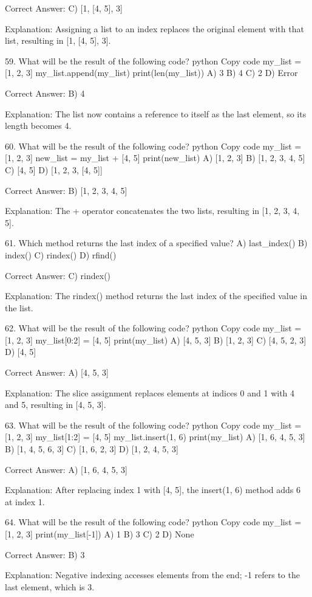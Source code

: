 Correct Answer: C) [1, [4, 5], 3]

Explanation:
Assigning a list to an index replaces the original element with that list, resulting in [1, [4, 5], 3].

59. What will be the result of the following code?
python
Copy code
my_list = [1, 2, 3]
my_list.append(my_list)
print(len(my_list))
A) 3
B) 4
C) 2
D) Error

Correct Answer: B) 4

Explanation:
The list now contains a reference to itself as the last element, so its length becomes 4.

60. What will be the result of the following code?
python
Copy code
my_list = [1, 2, 3]
new_list = my_list + [4, 5]
print(new_list)
A) [1, 2, 3]
B) [1, 2, 3, 4, 5]
C) [4, 5]
D) [1, 2, 3, [4, 5]]

Correct Answer: B) [1, 2, 3, 4, 5]

Explanation:
The + operator concatenates the two lists, resulting in [1, 2, 3, 4, 5].

61. Which method returns the last index of a specified value?
A) last_index()
B) index()
C) rindex()
D) rfind()

Correct Answer: C) rindex()

Explanation:
The rindex() method returns the last index of the specified value in the list.

62. What will be the result of the following code?
python
Copy code
my_list = [1, 2, 3]
my_list[0:2] = [4, 5]
print(my_list)
A) [4, 5, 3]
B) [1, 2, 3]
C) [4, 5, 2, 3]
D) [4, 5]

Correct Answer: A) [4, 5, 3]

Explanation:
The slice assignment replaces elements at indices 0 and 1 with 4 and 5, resulting in [4, 5, 3].

63. What will be the result of the following code?
python
Copy code
my_list = [1, 2, 3]
my_list[1:2] = [4, 5]
my_list.insert(1, 6)
print(my_list)
A) [1, 6, 4, 5, 3]
B) [1, 4, 5, 6, 3]
C) [1, 6, 2, 3]
D) [1, 2, 4, 5, 3]

Correct Answer: A) [1, 6, 4, 5, 3]

Explanation:
After replacing index 1 with [4, 5], the insert(1, 6) method adds 6 at index 1.

64. What will be the result of the following code?
python
Copy code
my_list = [1, 2, 3]
print(my_list[-1])
A) 1
B) 3
C) 2
D) None

Correct Answer: B) 3

Explanation:
Negative indexing accesses elements from the end; -1 refers to the last element, which is 3.

